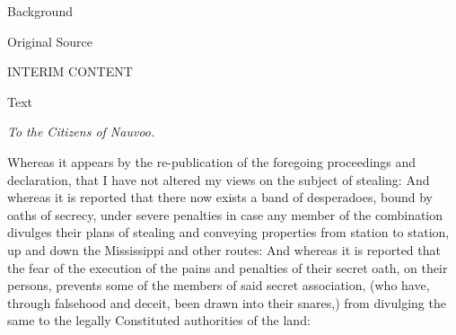 			\begin{description}
				\item[Background]
			\end{description}
			
			
			\begin{description}
				\item[Original Source]
			\end{description}
			
				INTERIM CONTENT
			
			
			\begin{description}
				\item[Text]
			\end{description}
			

				\textit{To the Citizens of Nauvoo.}

				Whereas it appears by the re-publication of the foregoing proceedings and declaration, that I have not altered my views on the subject of stealing: And whereas it is reported that there now exists a band of desperadoes, bound by oaths of secrecy, under severe penalties in case any member of the combination divulges their plans of stealing and conveying properties from station to station, up and down the Mississippi and other routes: And whereas it is reported that the fear of the execution of the pains and penalties of their secret oath, on their persons, prevents some of the members of said secret association, (who have, through falsehood and deceit, been drawn into their snares,) from divulging the same to the legally Constituted authorities of the land:


